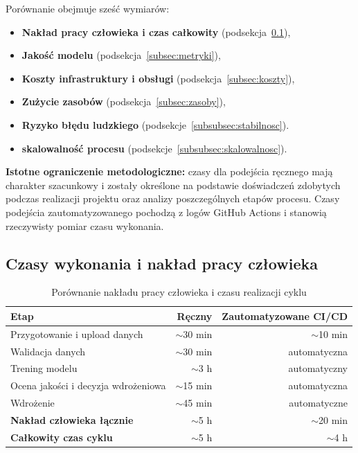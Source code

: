 Porównanie obejmuje sześć wymiarów:
\begin{itemize}
  \item \textbf{Nakład pracy człowieka i czas całkowity} (podsekcja~\ref{subsec:czasy}),
  \item \textbf{Jakość modelu} (podsekcja~\ref{subsec:metryki}),
  \item \textbf{Koszty infrastruktury i obsługi} (podsekcja~\ref{subsec:koszty}),
  \item \textbf{Zużycie zasobów} (podsekcja~\ref{subsec:zasoby}),
  \item \textbf{Ryzyko błędu ludzkiego} (podsekcje~\ref{subsubsec:stabilnosc}).
  \item \textbf{skalowalność procesu} (podsekcje~\ref{subsubsec:skalowalnosc}).
\end{itemize}

\textbf{Istotne ograniczenie metodologiczne:} czasy dla podejścia ręcznego mają charakter szacunkowy i zostały określone na podstawie doświadczeń zdobytych podczas realizacji projektu oraz analizy poszczególnych etapów procesu. Czasy podejścia zautomatyzowanego pochodzą z logów GitHub Actions i stanowią rzeczywisty pomiar czasu wykonania.

\subsection{Czasy wykonania i nakład pracy człowieka}
\label{subsec:czasy}

\begin{table}[H]
\centering
\caption{Porównanie nakładu pracy człowieka i czasu realizacji cyklu}
\label{tab:czasy}
\begin{tabular}{|l|r|r|}
\hline
\textbf{Etap} & \textbf{Ręczny} & \textbf{Zautomatyzowane CI/CD} \\
\hline
Przygotowanie i upload danych & $\sim$30 min & $\sim$10 min \\
Walidacja danych & $\sim$30 min & automatyczna \\
Trening modelu & $\sim$3 h & automatyczny \\
Ocena jakości i decyzja wdrożeniowa & $\sim$15 min & automatyczna \\
Wdrożenie & $\sim$45 min & automatyczne \\
\hline
\textbf{Nakład człowieka łącznie} & $\sim$5 h & $\sim$20 min \\
\textbf{Całkowity czas cyklu} & $\sim$5 h & $\sim$4 h \\
\hline
\end{tabular}
\end{table}

